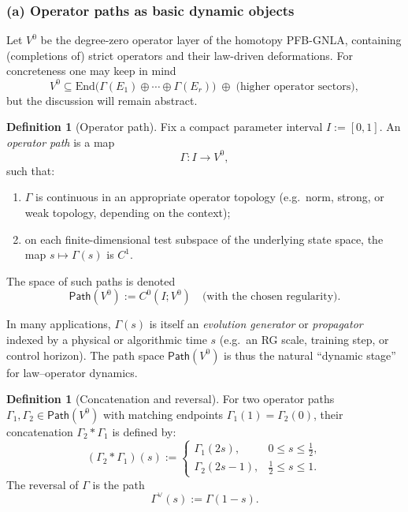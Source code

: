 \documentclass[11pt]{book}
\theoremstyle{plain}
\theoremstyle{definition}
\newtheorem{definition}[theorem]{Definition} \theoremstyle{remark}
\begin{document}
\subsubsection*{(a) Operator paths as basic dynamic objects}

Let $V^0$ be the degree-zero operator layer of the homotopy PFB-GNLA,
containing (completions of) strict operators and their law-driven
deformations. For concreteness one may keep in mind
\[
   V^0
   \subseteq
   \mathrm{End}\bigl(\Gamma(E_1)\oplus\cdots\oplus\Gamma(E_r)\bigr)
   \;\oplus\; \text{(higher operator sectors)},
\]
but the discussion will remain abstract.

\begin{definition}[Operator path]
Fix a compact parameter interval $I:=[0,1]$. An \emph{operator path}
  is a map
  \[
     \Gamma:I\longrightarrow V^0,
  \]
  such that:
  \begin{enumerate}[label=\roman*)]
    \item $\Gamma$ is continuous in an appropriate operator topology
          (e.g.\ norm, strong, or weak topology, depending on the
          context);
    \item on each finite-dimensional test subspace of the underlying
          state space, the map $s\mapsto\Gamma(s)$ is $C^1$.
  \end{enumerate}
  The space of such paths is denoted
  \[
     \mathsf{Path}(V^0)
     :=
     C^0(I;V^0)
     \quad\text{(with the chosen regularity)}.
  \]
\end{definition}

In many applications, $\Gamma(s)$ is itself an \emph{evolution
generator} or \emph{propagator} indexed by a physical or algorithmic
time $s$ (e.g.\ an RG scale, training step, or control horizon). The
path space $\mathsf{Path}(V^0)$ is thus the natural “dynamic stage” for
law–operator dynamics.



\begin{definition}[Concatenation and reversal]
For two operator paths $\Gamma_1,\Gamma_2\in\mathsf{Path}(V^0)$ with
  matching endpoints $\Gamma_1(1)=\Gamma_2(0)$, their concatenation
  $\Gamma_2\ast\Gamma_1$ is defined by:
  \[
    (\Gamma_2\ast\Gamma_1)(s)
    :=
    \begin{cases}
      \Gamma_1(2s),
        & 0\le s\le \tfrac12,\\[0.2em]
      \Gamma_2(2s-1),
        & \tfrac12\le s\le 1.
    \end{cases}
  \]
  The reversal of $\Gamma$ is the path
  \[
     \Gamma^\vee(s) := \Gamma(1-s).
  \]
\end{definition}
\end{document}
